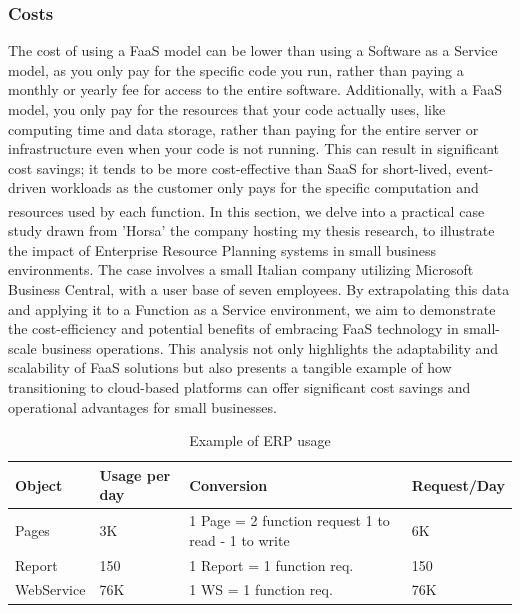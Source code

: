 \subsubsection{Costs}
The cost of using a FaaS model can be lower than using a Software as a Service model, as you only
pay for the specific code you run, rather than paying a monthly or yearly fee for access to the
entire software. Additionally, with a FaaS model, you only pay for the resources that your code
actually uses, like computing time and data storage, rather than paying for the entire server or
infrastructure even when your code is not running. This can result in significant cost savings; it
tends to be more cost-effective than SaaS for short-lived, event-driven workloads as the customer
only pays for the specific computation and resources used by each
function\textsuperscript{\cite{serverless_8}}.
\newline\newline
In this section, we delve into a practical case study drawn from 'Horsa' the company hosting my
thesis research, to illustrate the impact of Enterprise Resource Planning systems in small business
environments. The case involves a small Italian company utilizing Microsoft Business Central, with a
user base of seven employees. By extrapolating this data and applying it to a Function as a Service
environment, we aim to demonstrate the cost-efficiency and potential benefits of embracing FaaS
technology in small-scale business operations. This analysis not only highlights the adaptability
and scalability of FaaS solutions but also presents a tangible example of how transitioning to
cloud-based platforms can offer significant cost savings and operational advantages for small
businesses.

\begin{table}
    \centering
    \begin{tabular}{p{2cm} | p{2.5cm} | p{4.5cm} | p{2.5cm}}
        \hline\hline
        Object     & Usage per day & Conversion                                         & Request/Day \\
        \hline
        Pages      & 3K            & 1 Page = 2 function request 1 to read - 1 to write & 6K          \\
        Report     & 150           & 1 Report = 1 function req.                         & 150         \\
        WebService & 76K           & 1 WS = 1 function req.                             & 76K         \\
        \hline \hline
    \end{tabular}
    \caption{Example of ERP usage}
    \label{tab:3_table_ERP_usage}
\end{table}

